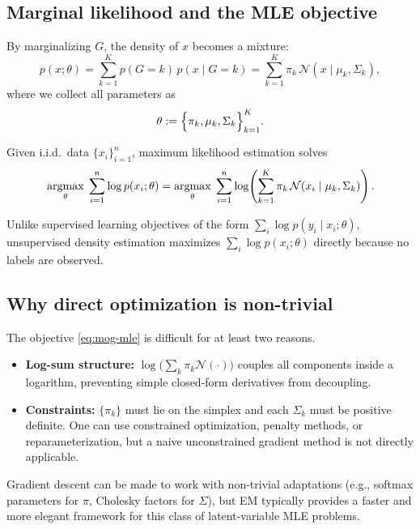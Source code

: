 \documentclass[../main]{subfiles}
\begin{document}
\subsection{Marginal likelihood and the MLE objective}
By marginalizing $G$, the density of $x$ becomes a mixture:
\begin{equation}\label{eq:mog-marginal}
    p(x;\theta)
    =
    \sum_{k=1}^K p(G=k)\,p(x\mid G=k)
    =
    \sum_{k=1}^K \pi_k\,\mathcal N(x\mid \mu_k,\Sigma_k),
\end{equation}
where we collect all parameters as
\begin{equation}
    \theta := \Bigl\{\pi_k,\mu_k,\Sigma_k\Bigr\}_{k=1}^K.
\end{equation}

Given i.i.d.\ data $\{x_i\}_{i=1}^n$, maximum likelihood estimation solves
\begin{equation}\label{eq:mog-mle}
    \mathop{\mathrm{argmax}}_{\theta}\;
    \sum_{i=1}^n \log p(x_i;\theta)
    =
    \mathop{\mathrm{argmax}}_{\theta}\;
    \sum_{i=1}^n
    \log\!\left(
        \sum_{k=1}^K \pi_k\,\mathcal N(x_i\mid \mu_k,\Sigma_k)
    \right).
\end{equation}

\begin{remark}
    Unlike supervised learning objectives of the form $\sum_i \log p(y_i\mid
    x_i;\theta)$, unsupervised density estimation maximizes $\sum_i \log
    p(x_i;\theta)$ directly because no labels are observed.
\end{remark}

\subsection{Why direct optimization is non-trivial}
The objective \eqref{eq:mog-mle} is difficult for at least two reasons.
\begin{itemize}
    \item \textbf{Log-sum structure:} $\log\big(\sum_k \pi_k \mathcal N(\cdot)\big)$
    couples all components inside a logarithm, preventing simple closed-form
    derivatives from decoupling.
    \item \textbf{Constraints:} $\{\pi_k\}$ must lie on the simplex and each
    $\Sigma_k$ must be positive definite. One can use constrained optimization,
    penalty methods, or reparameterization, but a naive unconstrained gradient
    method is not directly applicable.
\end{itemize}
\begin{remark}
    Gradient descent can be made to work with non-trivial adaptations (e.g.,
    softmax parameters for $\pi$, Cholesky factors for $\Sigma$), but EM
    typically provides a faster and more elegant framework for this class of
    latent-variable MLE problems.
\end{remark}
\end{document}

